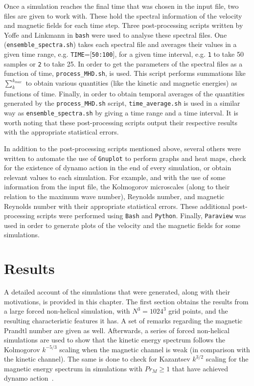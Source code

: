\documentclass[12pt,a4paper]{report}
\begin{document}
Once a simulation reaches the final time that was chosen in the input file, two files are given to work with. These hold the spectral information of the velocity and magnetic fields for each time step. Three post-processing scripts written by Yoffe and Linkmann in \texttt{bash} were used to analyse these spectral files. One (\texttt{ensemble\_spectra.sh}) takes each spectral file and averages their values in a given time range, e.g. \texttt{TIME}=[\texttt{50:100}], for a given time interval, e.g. \texttt{1} to take 50 samples or \texttt{2} to take 25. In order to get the parameters of the spectral files as a function of time, \texttt{process\_MHD.sh}, is used. This script performs summations like $\sum_k^{k_{max}}$ to obtain various quantities (like the kinetic and magnetic energies) as functions of time. Finally, in order to obtain temporal averages of the quantities generated by the \texttt{process\_MHD.sh} script, \texttt{time\_average.sh} is used in a similar way as \texttt{ensemble\_spectra.sh} by giving a time range and a time interval. It is worth noting that these post-processing scripts output their respective results with the appropriate statistical errors.

In addition to the post-processing scripts mentioned above, several others were written to automate the use of \texttt{Gnuplot} to perform graphs and heat maps, check for the existence of dynamo action in the end of every simulation, or obtain relevant values to each simulation. For example, and with the use of some information from the input file, the Kolmogorov microscales (along to their relation to the maximum wave number), Reynolds number, and magnetic Reynolds number with their appropriate statistical errors. These additional post-processing scripts were performed using \texttt{Bash} and \texttt{Python}. Finally, \texttt{Paraview} was used in order to generate plots of the velocity and the magnetic fields for some simulations. 















\chapter{Results}
\label{ch5}

A detailed account of the simulations that were generated, along with their motivations, is provided in this chapter. The first section obtains the results from a large forced non-helical simulation, with $N^3=1024^3$ grid points, and the resulting characteristic features it has. A set of remarks regarding the magnetic Prandtl number are given as well. Afterwards, a series of forced non-helical simulations are used to show that the kinetic energy spectrum follows the Kolmogorov $k^{-5/3}$ scaling when the magnetic channel is weak (in comparison with the kinetic channel). The same is done to check for Kazantsev $k^{3/2}$ scaling for the magnetic energy spectrum in simulations with $Pr_M \geq 1$ that have achieved dynamo action~\cite{haugen2004simulations}. 
\end{document}

